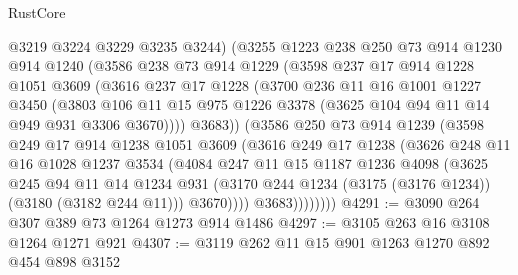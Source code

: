 \begin{lexlean}{RustCore}
\begin{coremodule}
                @3219
                @3224
                @3229
                @3235
                @3244)
              (@3255
                @1223
                @238
                @250
                @73
                @914
                @1230
                @914
                @1240
                (@3586
                  @238
                  @73
                  @914
                  @1229
                  (@3598
                    @237
                    @17
                    @914
                    @1228
                    @1051
                    @3609
                    (@3616
                      @237
                      @17
                      @1228
                      (@3700
                        @236
                        @11
                        @16
                        @1001
                        @1227
                        @3450
                        (@3803
                          @106
                          @11
                          @15
                          @975
                          @1226
                          @3378
                          (@3625 @104 @94 @11 @14 @949 @931 @3306 @3670))))
                    @3683))
                (@3586
                  @250
                  @73
                  @914
                  @1239
                  (@3598
                    @249
                    @17
                    @914
                    @1238
                    @1051
                    @3609
                    (@3616
                      @249
                      @17
                      @1238
                      (@3626
                        @248
                        @11
                        @16
                        @1028
                        @1237
                        @3534
                        (@4084
                          @247
                          @11
                          @15
                          @1187
                          @1236
                          @4098
                          (@3625
                            @245
                            @94
                            @11
                            @14
                            @1234
                            @931
                            (@3170 @244 @1234 (@3175 (@3176 @1234)) (@3180 (@3182 @244 @11)))
                            @3670))))
                    @3683))))))))
@4291 := @3090 @264 @307 @389 @73 @1264 @1273 @914 @1486
@4297 := @3105 @263 @16 @3108 @1264 @1271 @921
@4307 := @3119 @262 @11 @15 @901 @1263 @1270 @892 @454 @898 @3152

\end{coremodule}
\end{lexlean}
